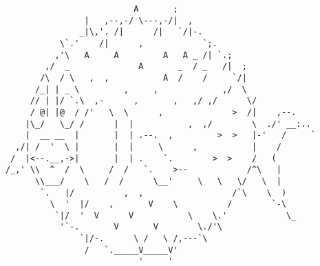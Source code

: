 \documentclass{article}
\begin{document}
\vfill
\centering
\scriptsize
\begin{BVerbatim}
                          A       ;
                |   ,--,-/ \---,-/|  ,
               _|\,'. /|      /|   `/|-.
           \`.'    /|      ,            `;.
          ,'\   A     A         A   A _ /| `.;
        ,/  _              A       _  / _   /|  ;
       /\  / \   ,  ,           A  /    /     `/|
      /_| | _ \         ,     ,             ,/  \
     // | |/ `.\  ,-      ,       ,   ,/ ,/      \/
     / @| |@  / /'   \  \      ,              >  /|    ,--.
    |\_/   \_/ /      |  |           ,  ,/        \  ./' __:..
    |  __ __  |       |  | .--.  ,         >  >   |-'   /     `
  ,/| /  '  \ |       |  |     \      ,           |    /
 /  |<--.__,->|       |  | .    `.        >  >    /   (
/_,' \\  ^  /  \     /  /   `.    >--            /^\   |
      \\___/    \   /  /      \__'     \   \   \/   \  |
       `.   |/          ,  ,                  /`\    \  )
         \  '  |/    ,       V    \          /        `-\
          `|/  '  V      V           \    \.'            \_
           '`-.       V       V        \./'\
               `|/-.      \ /   \ /,---`\         
                /   `._____V_____V'
                           '     '
\end{BVerbatim}
\end{document}

